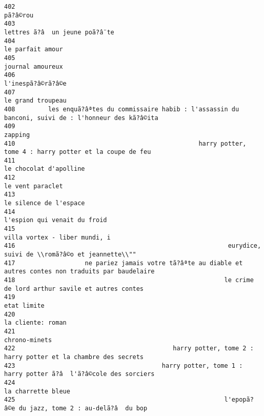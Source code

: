 \documentclass[
]{report}
\begin{document}
\begin{verbatim}
402                                                                                                pã?â©rou
403                                                                          lettres ã?â  un jeune poã?â¨te
404                                                                                        le parfait amour
405                                                                                        journal amoureux
406                                                                                       l'inespã?â©rã?â©e
407                                                                                       le grand troupeau
408         les enquã?âªtes du commissaire habib : l'assassin du banconi, suivi de : l'honneur des kã?â©ita
409                                                                                                 zapping
410                                                  harry potter, tome 4 : harry potter et la coupe de feu
411                                                                                  le chocolat d'apolline
412                                                                                        le vent paraclet
413                                                                                  le silence de l'espace
414                                                                            l'espion qui venait du froid
415                                                                           villa vortex - liber mundi, i
416                                                          eurydice, suivi de \\romã?â©o et jeannette\\""
417                   ne pariez jamais votre tã?âªte au diable et autres contes non traduits par baudelaire
418                                                         le crime de lord arthur savile et autres contes
419                                                                                             etat limite
420                                                                                       la cliente: roman
421                                                                                           chrono-minets
422                                           harry potter, tome 2 : harry potter et la chambre des secrets
423                                        harry potter, tome 1 : harry potter ã?â  l'ã?â©cole des sorciers
424                                                                                      la charrette bleue
425                                                         l'epopã?â©e du jazz, tome 2 : au-delã?â  du bop

\end{verbatim}
\end{document}
